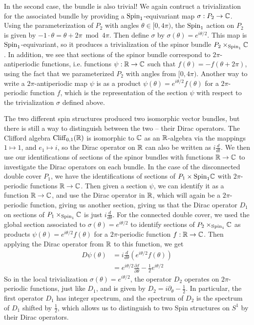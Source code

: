 \begin{exmp}
In the second case, the bundle is also trivial! We again contruct a trivialization
for the associated bundle by providing a $\mathrm{Spin}_1$-equivariant map
$\sigma : P_2 \to \mathbb{C}$. Using the parameterization of $P_2$ with angles
$\theta \in [0,4\pi)$, the $\mathrm{Spin}_1$ action on $P_2$ is given by
$-1 \cdot \theta = \theta + 2\pi \bmod 4\pi$. Then define $\sigma$ by
$\sigma(\theta) = e^{i\theta/2}$. This map is $\mathrm{Spin}_1$-equivariant, so
it produces a trivialization of the spinor bundle $P_2 \times_{\mathrm{Spin}_1} \mathbb{C}$.
In addition, we see that sections of the spinor bundle correspond
to $2\pi$-antiperiodic functions, i.e. functions $\psi : \mathbb{R} \to \mathbb{C}$ such that
$f(\theta) = -f(\theta + 2\pi)$, using the fact that we parameterized $P_2$
with angles from $[0, 4\pi)$. Another way to write a $2\pi$-antiperiodic map
$\psi$ is as a product $\psi(\theta) = e^{i\theta/2}f(\theta)$ for a $2\pi$-periodic
function $f$, which is the representation of the section $\psi$ with respect to the
trivialization $\sigma$ defined above.

The two different spin structures produced two isomorphic vector bundles,
but there is still a way to distinguish between the two -- their Dirac operators.
The Clifford algebra $\operatorname{Cliff}_{0,1}(\mathbb{R})$ is isomorphic to $\mathbb{C}$ as an $\mathbb{R}$-algebra
via the mappings $1 \mapsto 1$, and $e_1 \mapsto i$, so the Dirac operator on
$\mathbb{R}$ can also be written as $i \frac{d}{dt}$. We then use our identifications
of sections of the spinor bundles with functions $\mathbb{R} \to \mathbb{C}$ to investigate the
Dirac operators on each bundle. In the case of the disconnected double cover $P_1$,
we have the identifications of sections of $P_1 \times{\mathrm{Spin}_1} \mathbb{C}$ with
$2\pi$-periodic functions $\mathbb{R} \to \mathbb{C}$. Then given a section $\psi$, we
can identify it as a function $\mathbb{R} \to \mathbb{C}$, and use the Dirac operator in $\mathbb{R}$,
which will again be a $2\pi$-periodic function, giving us another section,
giving us that the Dirac operator $D_1$ on sections of $P_1 \times_{\mathrm{Spin}_1} \mathbb{C}$
is just $i\frac{d}{d\theta}$. For the connected double cover, we used the
global section associated to $\sigma(\theta) = e^{i\theta /2}$ to identify
sections of $P_2 \times_{\mathrm{Spin}_1} \mathbb{C}$ as products
$\psi(\theta) = e^{i\theta/2}f(\theta)$ for a $2\pi$-periodic function $f : \mathbb{R} \to \mathbb{C}$.
Then applying the Dirac operator from $\mathbb{R}$ to this function, we get
%
\begin{align*}
D\psi(\theta) &= i\frac{d}{d\theta}\left( e^{i\theta/2}f(\theta) \right) \\
&= e^{i\theta/2}\frac{\partial f}{\partial \theta} - \frac{1}{2}e^{i\theta/2}
\end{align*}
%
So in the local trivialization $\sigma(\theta) = e^{i\theta/2}$, the operator $D_2$
operates on $2\pi$-periodic functions, just like $D_1$, and is given by
$D_2 = i\partial_\theta - \frac{1}{2}$. In particular, the first operator $D_1$ has
integer spectrum, and the spectrum of $D_2$ is the spectrum of $D_1$ shifted by
$\frac{1}{2}$, which allows us to distinguish to two Spin structures on $S^1$
by their Dirac operators.
%
\end{exmp}

